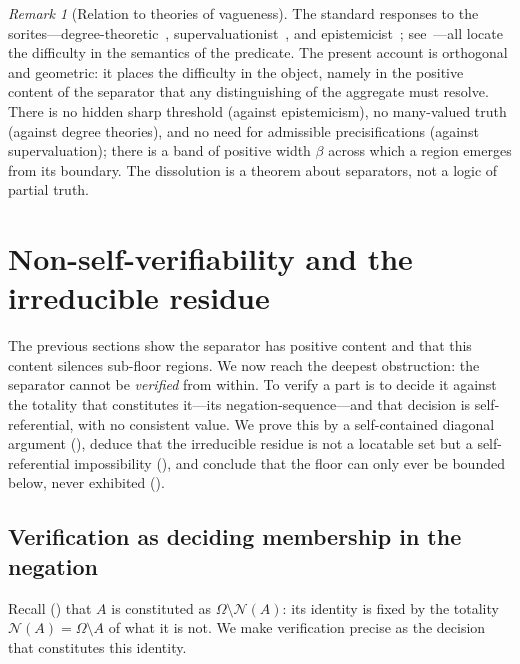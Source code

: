 \documentclass[11pt,a4paper]{article}
\theoremstyle{thmstyle}
\theoremstyle{definition}
\theoremstyle{remark}
\newtheorem{remark}[theorem]{Remark}
\newcommand{\Space}{\Omega}
\newcommand{\thick}{\beta}
\newcommand{\Neg}{\mathcal{N}}
\begin{document}
\begin{remark}[Relation to theories of vagueness]
\label{rem:vagueness}
The standard responses to the sorites---degree-theoretic~\citep{zadeh1965},
supervaluationist~\citep{fine1975,keefe2000}, and
epistemicist~\citep{williamson1994}; see~\citet{black1937,hyderaffman2018}---all
locate the difficulty in the semantics of the predicate. The present account is
orthogonal and geometric: it places the difficulty in the object, namely in the
positive content of the separator that any distinguishing of the aggregate must
resolve. There is no hidden sharp threshold (against epistemicism), no
many-valued truth (against degree theories), and no need for admissible
precisifications (against supervaluation); there is a band of positive width
$\thick$ across which a region emerges from its boundary. The dissolution is a
theorem about separators, not a logic of partial truth.
\end{remark}


\section{Non-self-verifiability and the irreducible residue}
\label{sec:residue}

The previous sections show the separator has positive content and that this
content silences sub-floor regions. We now reach the deepest obstruction: the
separator cannot be \emph{verified} from within. To verify a part is to decide it
against the totality that constitutes it---its negation-sequence---and that
decision is self-referential, with no consistent value. We prove this by a
self-contained diagonal argument (), deduce that the
irreducible residue is not a locatable set but a self-referential impossibility
(), and conclude that the floor can only ever be
bounded below, never exhibited ().

\subsection{Verification as deciding membership in the negation}

Recall () that $A$ is constituted as $\Space\setminus\Neg(A)$:
its identity is fixed by the totality $\Neg(A)=\Space\setminus A$ of what it is
not. We make verification precise as the decision that constitutes this identity.
\end{document}
